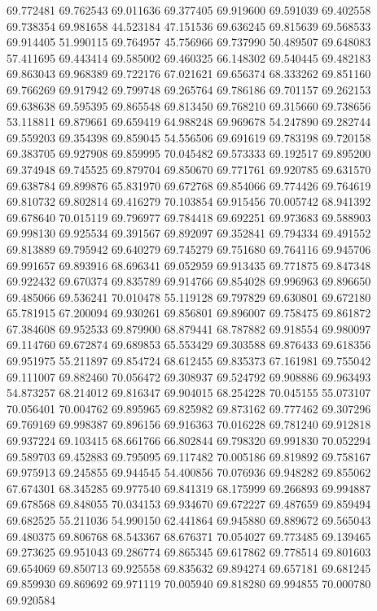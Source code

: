 69.772481
69.762543
69.011636
69.377405
69.919600
69.591039
69.402558
69.738354
69.981658
44.523184
47.151536
69.636245
69.815639
69.568533
69.914405
51.990115
69.764957
45.756966
69.737990
50.489507
69.648083
57.411695
69.443414
69.585002
69.460325
66.148302
69.540445
69.482183
69.863043
69.968389
69.722176
67.021621
69.656374
68.333262
69.851160
69.766269
69.917942
69.799748
69.265764
69.786186
69.701157
69.262153
69.638638
69.595395
69.865548
69.813450
69.768210
69.315660
69.738656
53.118811
69.879661
69.659419
64.988248
69.969678
54.247890
69.282744
69.559203
69.354398
69.859045
54.556506
69.691619
69.783198
69.720158
69.383705
69.927908
69.859995
70.045482
69.573333
69.192517
69.895200
69.374948
69.745525
69.879704
69.850670
69.771761
69.920785
69.631570
69.638784
69.899876
65.831970
69.672768
69.854066
69.774426
69.764619
69.810732
69.802814
69.416279
70.103854
69.915456
70.005742
68.941392
69.678640
70.015119
69.796977
69.784418
69.692251
69.973683
69.588903
69.998130
69.925534
69.391567
69.892097
69.352841
69.794334
69.491552
69.813889
69.795942
69.640279
69.745279
69.751680
69.764116
69.945706
69.991657
69.893916
68.696341
69.052959
69.913435
69.771875
69.847348
69.922432
69.670374
69.835789
69.914766
69.854028
69.996963
69.896650
69.485066
69.536241
70.010478
55.119128
69.797829
69.630801
69.672180
65.781915
67.200094
69.930261
69.856801
69.896007
69.758475
69.861872
67.384608
69.952533
69.879900
68.879441
68.787882
69.918554
69.980097
69.114760
69.672874
69.689853
65.553429
69.303588
69.876433
69.618356
69.951975
55.211897
69.854724
68.612455
69.835373
67.161981
69.755042
69.111007
69.882460
70.056472
69.308937
69.524792
69.908886
69.963493
54.873257
68.214012
69.816347
69.904015
68.254228
70.045155
55.073107
70.056401
70.004762
69.895965
69.825982
69.873162
69.777462
69.307296
69.769169
69.998387
69.896156
69.916363
70.016228
69.781240
69.912818
69.937224
69.103415
68.661766
66.802844
69.798320
69.991830
70.052294
69.589703
69.452883
69.795095
69.117482
70.005186
69.819892
69.758167
69.975913
69.245855
69.944545
54.400856
70.076936
69.948282
69.855062
67.674301
68.345285
69.977540
69.841319
68.175999
69.266893
69.994887
69.678568
69.848055
70.034153
69.934670
69.672227
69.487659
69.859494
69.682525
55.211036
54.990150
62.441864
69.945880
69.889672
69.565043
69.480375
69.806768
68.543367
68.676371
70.054027
69.773485
69.139465
69.273625
69.951043
69.286774
69.865345
69.617862
69.778514
69.801603
69.654069
69.850713
69.925558
69.835632
69.894274
69.657181
69.681245
69.859930
69.869692
69.971119
70.005940
69.818280
69.994855
70.000780
69.920584
